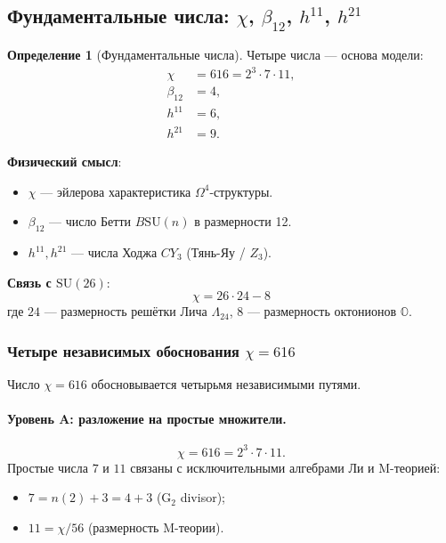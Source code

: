 \documentclass[11pt,a4paper]{article}
\newcommand{\SU}{\ensuremath{\mathrm{SU}}}
\newcommand{\CY}{\ensuremath{CY_3}}
\newcommand{\Om}{\ensuremath{\Omega^4}}
\theoremstyle{definition}
\newtheorem{definition}[theorem]{Определение}
\begin{document}
\subsection{Фундаментальные числа: \texorpdfstring{$\chi$, $\beta_{12}$, $h^{11}$, $h^{21}$}{chi, beta12, h11, h21}}
\label{subsec:fundamental-numbers}

\begin{definition}[Фундаментальные числа]
\label{def:fundamental-numbers}
Четыре числа --- основа модели:
\begin{align}
    \chi &= 616 = 2^3 \cdot 7 \cdot 11, \\
    \beta_{12} &= 4, \\
    h^{11} &= 6, \\
    h^{21} &= 9.
\end{align}
\end{definition}

\textbf{Физический смысл}:
\begin{itemize}
    \item $\chi$ --- эйлерова характеристика $\Om$-структуры.
    \item $\beta_{12}$ --- число Бетти $B\SU(n)$ в размерности 12.
    \item $h^{11}, h^{21}$ --- числа Ходжа $\CY$ (Тянь-Яу / $Z_3$).
\end{itemize}

\textbf{Связь с $\SU(26)$}:
\begin{equation}
    \chi = 26 \cdot 24 - 8
    \label{eq:chi-leech}
\end{equation}
где $24$ --- размерность решётки Лича $\Lambda_{24}$,
$8$ --- размерность октонионов $\mathbb{O}$.

\subsubsection{Четыре независимых обоснования \texorpdfstring{$\chi = 616$}{ = 616}}
\label{subsubsec:chi-justification}

Число $\chi = 616$ обосновывается четырьмя независимыми путями.

\paragraph{Уровень A: разложение на простые множители.}
\begin{equation}
    \chi = 616 = 2^3 \cdot 7 \cdot 11.
\end{equation}
Простые числа $7$ и $11$ связаны с исключительными алгебрами Ли
и M-теорией:
\begin{itemize}
    \item $7 = n(2) + 3 = 4 + 3$ (G$_2$ divisor);
    \item $11 = \chi/56$ (размерность M-теории).
\end{itemize}
\end{document}
